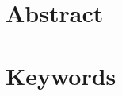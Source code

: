 \documentclass{article}
\title{}
\begin{document}
\maketitle
\section*{Abstract}
    
\section*{Keywords}
    



\end{document}
